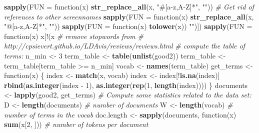 \documentclass[12pt,]{article}
\newenvironment{Shaded}{\begin{snugshade}}{\end{snugshade}}
\newcommand{\KeywordTok}[1]{\textcolor[rgb]{0.13,0.29,0.53}{\textbf{{#1}}}}
\newcommand{\DataTypeTok}[1]{\textcolor[rgb]{0.13,0.29,0.53}{{#1}}}
\newcommand{\DecValTok}[1]{\textcolor[rgb]{0.00,0.00,0.81}{{#1}}}
\newcommand{\StringTok}[1]{\textcolor[rgb]{0.31,0.60,0.02}{{#1}}}
\newcommand{\CommentTok}[1]{\textcolor[rgb]{0.56,0.35,0.01}{\textit{{#1}}}}
\newcommand{\OtherTok}[1]{\textcolor[rgb]{0.56,0.35,0.01}{{#1}}}
\newcommand{\NormalTok}[1]{{#1}}
\begin{document}
\begin{Shaded}
\begin{Highlighting}[]
{{{{{{{{\KeywordTok{sapply}\NormalTok{(}\DataTypeTok{FUN =} \NormalTok{function(x) }\KeywordTok{str_replace_all}\NormalTok{(x, }\StringTok{"#[a-z,A-Z]*"}\NormalTok{, }\StringTok{""}\NormalTok{)) %
\StringTok{    }\CommentTok{# Get rid of references to other screennames}
\KeywordTok{sapply}\NormalTok{(}\DataTypeTok{FUN =} \NormalTok{function(x) }\KeywordTok{str_replace_all}\NormalTok{(x, }\StringTok{"@[a-z,A-Z]*"}\NormalTok{, }\StringTok{""}\NormalTok{)) %
\StringTok{    }\KeywordTok{sapply}\NormalTok{(}\DataTypeTok{FUN =} \NormalTok{function(x) }\KeywordTok{tolower}\NormalTok{(x)) %
\StringTok{    ""}\NormalTok{)]) %
\KeywordTok{sapply}\NormalTok{(}\DataTypeTok{FUN =} \NormalTok{function(x) x[!(x %
\CommentTok{# remove stopwords from}
\CommentTok{# http://cpsievert.github.io/LDAvis/reviews/reviews.html}
\CommentTok{# compute the table of terms:}
\NormalTok{n_min <-}\StringTok{ }\DecValTok{3}
\NormalTok{term_table <-}\StringTok{ }\KeywordTok{table}\NormalTok{(}\KeywordTok{unlist}\NormalTok{(good2)) %
\NormalTok{term_table <-}\StringTok{ }\NormalTok{term_table[term_table >=}\StringTok{ }\NormalTok{n_min]}
\NormalTok{vocab <-}\StringTok{ }\KeywordTok{names}\NormalTok{(term_table)}
\NormalTok{get_terms <-}\StringTok{ }\NormalTok{function(x) \{}
    \NormalTok{index <-}\StringTok{ }\KeywordTok{match}\NormalTok{(x, vocab)}
    \NormalTok{index <-}\StringTok{ }\NormalTok{index[!}\KeywordTok{is.na}\NormalTok{(index)]}
    \KeywordTok{rbind}\NormalTok{(}\KeywordTok{as.integer}\NormalTok{(index -}\StringTok{ }\DecValTok{1}\NormalTok{), }\KeywordTok{as.integer}\NormalTok{(}\KeywordTok{rep}\NormalTok{(}\DecValTok{1}\NormalTok{, }\KeywordTok{length}\NormalTok{(index))))}
\NormalTok{\}}
\NormalTok{documents <-}\StringTok{ }\KeywordTok{lapply}\NormalTok{(good2, get_terms)}
\CommentTok{# Compute some statistics related to the data set:}
\NormalTok{D <-}\StringTok{ }\KeywordTok{length}\NormalTok{(documents)  }\CommentTok{# number of documents }
\NormalTok{W <-}\StringTok{ }\KeywordTok{length}\NormalTok{(vocab)  }\CommentTok{# number of terms in the vocab}
\NormalTok{doc.length <-}\StringTok{ }\KeywordTok{sapply}\NormalTok{(documents, function(x) }\KeywordTok{sum}\NormalTok{(x[}\DecValTok{2}\NormalTok{, ]))  }\CommentTok{# number of tokens per document }
}}}}}}}}}}}}}}
\end{Highlighting}
\end{Shaded}
\end{document}
